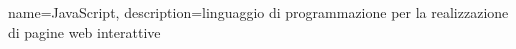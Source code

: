 {
	name={JavaScript},
	description={linguaggio di programmazione per la realizzazione di pagine web interattive}
}